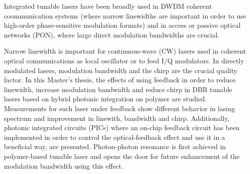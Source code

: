 
\Abstract

Integrated tunable lasers have been broadly used in DWDM coherent coommunication systems (where narrow linewidths are important in order to use high-order phase-sensitive modulation formats) and in access or passive optical networks (PON), where large direct modulation bandwidths are crucial.

Narrow linewidth is important for continuous-wave (CW) lasers used in coherent optical communications as local oscillator or to feed I/Q modulators. In directly modulated lasers, modulation bandwidth and the chirp are the crucial quality factor.
In this Master's thesis, the effects of using feedback in order to reduce linewidth, increase modulation bandwidth and reduce chirp in DBR tunable lasers based on hybrid photonic integration on polymer are studied.
Measurements for such laser under feedback show different behavior in lasing spectrum and improvement in linewith, bandwidth and chirp. 
Additionally, photonic integrated circuits (PICs) where an on-chip feedback circuit has been implemented in order to control the optical-feedback effect and use it in a beneficial way, are presented.
Photon-photon resonance is first achieved in polymer-based tunable laser and opens the door for future enhancement of the modulation bandwidth using this effect.


